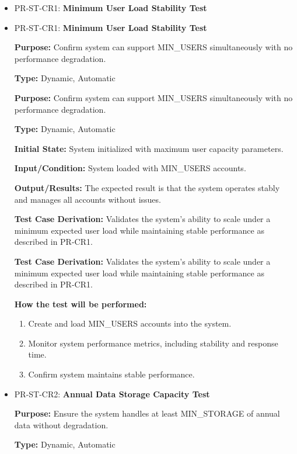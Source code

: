 \documentclass[12pt, titlepage]{article}
\begin{document}
\begin{itemize}
  \item PR-ST-CR1: \textbf{Minimum User Load Stability Test}
  \item PR-ST-CR1: \textbf{Minimum User Load Stability Test}
  \begin{mdframed}[linewidth=0.5mm]
      \textbf{Purpose:} Confirm system can support MIN\_USERS simultaneously with no performance degradation. \par
      \textbf{Type:} Dynamic, Automatic \par
      \textbf{Purpose:} Confirm system can support MIN\_USERS simultaneously with no performance degradation. \par
      \textbf{Type:} Dynamic, Automatic \par
      \textbf{Initial State:} System initialized with maximum user capacity parameters. \par
      \textbf{Input/Condition:} System loaded with MIN\_USERS accounts. \par
      \textbf{Output/Results:} The expected result is that the system operates stably and manages all accounts without issues. \par
      \textbf{Test Case Derivation:} Validates the system’s ability to scale under a minimum expected user load while maintaining stable performance as described in PR-CR1. \par
      \textbf{Test Case Derivation:} Validates the system’s ability to scale under a minimum expected user load while maintaining stable performance as described in PR-CR1. \par
      \textbf{How the test will be performed:}
      \begin{enumerate}[noitemsep]
        \item Create and load MIN\_USERS accounts into the system.
        \item Monitor system performance metrics, including stability and response time.
        \item Confirm system maintains stable performance.
      \end{enumerate}
  \end{mdframed}

  \item PR-ST-CR2: \textbf{Annual Data Storage Capacity Test}
    \begin{mdframed}[linewidth=0.5mm]
      \textbf{Purpose:} Ensure the system handles at least MIN\_STORAGE of annual data without degradation. \par
      \textbf{Type:} Dynamic, Automatic \par


\end{mdframed}
\end{itemize}
\end{document}
